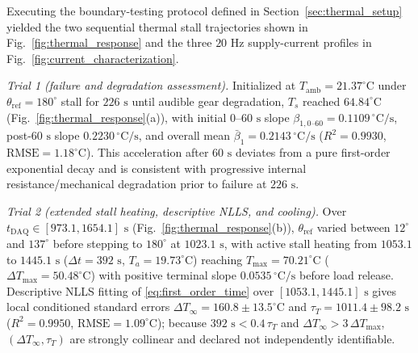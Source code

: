 \documentclass[lettersize,journal]{IEEEtran}
\begin{document}
	Executing the boundary-testing protocol defined in Section~\ref{sec:thermal_setup} yielded the two sequential thermal stall trajectories shown in Fig.~\ref{fig:thermal_response} and the three $20\text{ Hz}$ supply-current profiles in Fig.~\ref{fig:current_characterization}.
	
	\textit{Trial 1 (failure and degradation assessment).} Initialized at $T_{\text{amb}} = 21.37^\circ\text{C}$ under $\theta_{\text{ref}} = 180^\circ$ stall for $226\text{ s}$ until audible gear degradation, $T_s$ reached $64.84^\circ\text{C}$ (Fig.~\ref{fig:thermal_response}(a)), with initial $0\text{--}60\text{ s}$ slope $\beta_{1,0\text{--}60} = 0.1109\,^\circ\text{C/s}$, post-$60\text{ s}$ slope $0.2230\,^\circ\text{C/s}$, and overall mean $\bar{\beta}_1 = 0.2143\,^\circ\text{C/s}$ ($R^2 = 0.9930$, $\text{RMSE} = 1.18^\circ\text{C}$). This acceleration after $60\text{ s}$ deviates from a pure first-order exponential decay and is consistent with progressive internal resistance/mechanical degradation prior to failure at $226\text{ s}$.
	
	\textit{Trial 2 (extended stall heating, descriptive NLLS, and cooling).} Over $t_{\text{DAQ}} \in [973.1, 1654.1]\text{ s}$ (Fig.~\ref{fig:thermal_response}(b)), $\theta_{\text{ref}}$ varied between $12^\circ$ and $137^\circ$ before stepping to $180^\circ$ at $1023.1\text{ s}$, with active stall heating from $1053.1$ to $1445.1\text{ s}$ ($\Delta t = 392\text{ s}$, $T_a = 19.73^\circ\text{C}$) reaching $T_{\max} = 70.21^\circ\text{C}$ ($\Delta T_{\max} = 50.48^\circ\text{C}$) with positive terminal slope $0.0535\,^\circ\text{C/s}$ before load release. Descriptive NLLS fitting of \eqref{eq:first_order_time} over $[1053.1, 1445.1]\text{ s}$ gives local conditioned standard errors $\Delta T_\infty = 160.8 \pm 13.5^\circ\text{C}$ and $\tau_T = 1011.4 \pm 98.2\text{ s}$ ($R^2 = 0.9950$, $\text{RMSE} = 1.09^\circ\text{C}$); because $392\text{ s} < 0.4\,\tau_T$ and $\Delta T_\infty > 3\,\Delta T_{\max}$, $(\Delta T_\infty, \tau_T)$ are strongly collinear and declared not independently identifiable.
	
\end{document}
